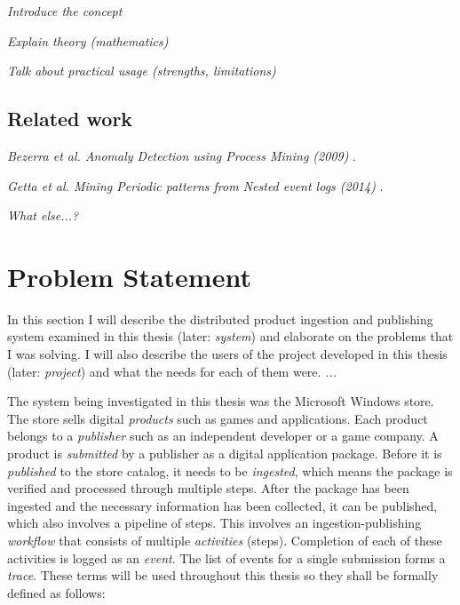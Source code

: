 \documentclass[english,12pt,a4paper,pdftex,sci,utf8]{aaltothesis}
\theoremstyle{definition}
\newcommand{\nyi}[1]{\noindent\colorbox{nyibg}{\textcolor{nyitext}{\emph{#1}}}}
\begin{document}
\nyi{Introduce the concept}

\nyi{Explain theory (mathematics)}

\nyi{Talk about practical usage (strengths, limitations)}


\subsection{Related work}
\label{sec:relatedwork}

\nyi{Bezerra et al. Anomaly Detection using Process Mining (2009)} \cite{bezerra2009anomaly}.

\nyi{Getta et al. Mining Periodic patterns from Nested event logs (2014)} \cite{getta2014mining}.

\nyi{What else...?}


\clearpage
\section{Problem Statement}
\label{sec:problem}

In this section I will describe the distributed product ingestion and publishing system examined in this thesis (later: \textit{system})  and elaborate on the 
problems that I was solving. I will also describe the users of the project developed in this thesis (later: \textit{project}) and what the needs for
each of them were. \nyi{...}

The system being investigated in this thesis was the Microsoft Windows store.
The store sells digital \emph{products} such as games and applications.
Each product belongs to a \emph{publisher} such as an independent developer or a game company.
A product is \emph{submitted} by a publisher as a digital application package.
Before it is \emph{published} to the store catalog, it needs to be \emph{ingested},
which means the package is verified and processed through multiple steps.
After the package has been ingested and the necessary information has been collected,
it can be published, which also involves a pipeline of steps.
This involves an ingestion-publishing \emph{workflow} that consists of multiple \emph{activities} (steps).
Completion of each of these activities is logged as an \emph{event}.
The list of events for a single submission forms a \emph{trace}.
These terms will be used throughout this thesis so they shall be formally defined as follows:
\end{document}

